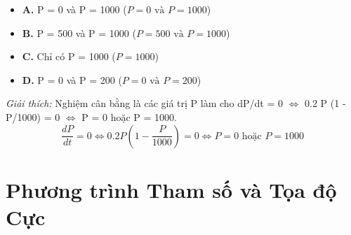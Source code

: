 \documentclass[11pt,a4paper,oneside]{book}
\begin{document}
\begin{enumerate}[label=\textbf{Câu \arabic*:}, leftmargin=2.2em, itemsep=8pt]
\begin{itemize}[label={}, leftmargin=1em, itemsep=2pt]
    \item \textbf{A.} P = 0 và P = 1000 \quad ($P = 0 \text{ và } P = 1000$)
    \item \textbf{B.} P = 500 và P = 1000 \quad ($P = 500 \text{ và } P = 1000$)
    \item \textbf{C.} Chỉ có P = 1000 \quad ($P = 1000$)
    \item \textbf{D.} P = 0 và P = 200 \quad ($P = 0 \text{ và } P = 200$)
  \end{itemize}
  \vspace{2pt}
   \textit{Giải thích:} Nghiệm cân bằng là các giá trị P làm cho dP/dt = 0 $\iff$  0.2 P (1 - P/1000) = 0 $\iff$  P = 0 hoặc P = 1000.
  \[ \frac{dP}{dt} = 0 \iff 0.2P\left(1 - \frac{P}{1000}\right) = 0 \iff P = 0 \text{ hoặc } P = 1000 \]
\end{enumerate}

\chapter{Phương trình Tham số và Tọa độ Cực}
\label{chap:chuong-10}
\end{document}

